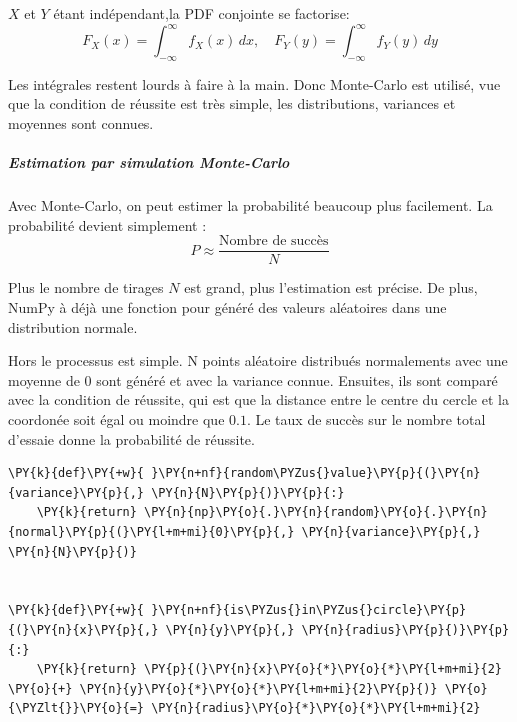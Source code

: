 \(X\) et \(Y\) étant indépendant,la PDF conjointe se factorise: \[
F_X(x) = \int_{-\infty}^{\infty} f_X(x) \, dx, \quad
F_Y(y) = \int_{-\infty}^{\infty} f_Y(y) \, dy
\]

Les intégrales restent lourds à faire à la main. Donc Monte-Carlo est
utilisé, vue que la condition de réussite est très simple, les
distributions, variances et moyennes sont connues.

\subparagraph{Estimation par simulation
Monte-Carlo}\label{estimation-par-simulation-monte-carlo}

Avec Monte-Carlo, on peut estimer la probabilité beaucoup plus
facilement. La probabilité devient simplement : \[
P \approx \frac{\text{Nombre de succès}}{N}
\]

Plus le nombre de tirages \(N\) est grand, plus l'estimation est
précise. De plus, NumPy à déjà une fonction pour généré des valeurs
aléatoires dans une distribution normale.

Hors le processus est simple. N points aléatoire distribués normalements
avec une moyenne de \(0\) sont généré et avec la variance connue.
Ensuites, ils sont comparé avec la condition de réussite, qui est que la
distance entre le centre du cercle et la coordonée soit égal ou moindre
que \(0.1\). Le taux de succès sur le nombre total d'essaie donne la
probabilité de réussite.

    \begin{tcolorbox}[breakable, size=fbox, boxrule=1pt, pad at break*=1mm,colback=cellbackground, colframe=cellborder]
\begin{Verbatim}[commandchars=\\\{\}]
\PY{k}{def}\PY{+w}{ }\PY{n+nf}{random\PYZus{}value}\PY{p}{(}\PY{n}{variance}\PY{p}{,} \PY{n}{N}\PY{p}{)}\PY{p}{:}
    \PY{k}{return} \PY{n}{np}\PY{o}{.}\PY{n}{random}\PY{o}{.}\PY{n}{normal}\PY{p}{(}\PY{l+m+mi}{0}\PY{p}{,} \PY{n}{variance}\PY{p}{,} \PY{n}{N}\PY{p}{)}


\PY{k}{def}\PY{+w}{ }\PY{n+nf}{is\PYZus{}in\PYZus{}circle}\PY{p}{(}\PY{n}{x}\PY{p}{,} \PY{n}{y}\PY{p}{,} \PY{n}{radius}\PY{p}{)}\PY{p}{:}
    \PY{k}{return} \PY{p}{(}\PY{n}{x}\PY{o}{*}\PY{o}{*}\PY{l+m+mi}{2} \PY{o}{+} \PY{n}{y}\PY{o}{*}\PY{o}{*}\PY{l+m+mi}{2}\PY{p}{)} \PY{o}{\PYZlt{}}\PY{o}{=} \PY{n}{radius}\PY{o}{*}\PY{o}{*}\PY{l+m+mi}{2}
\end{Verbatim}
\end{tcolorbox}

